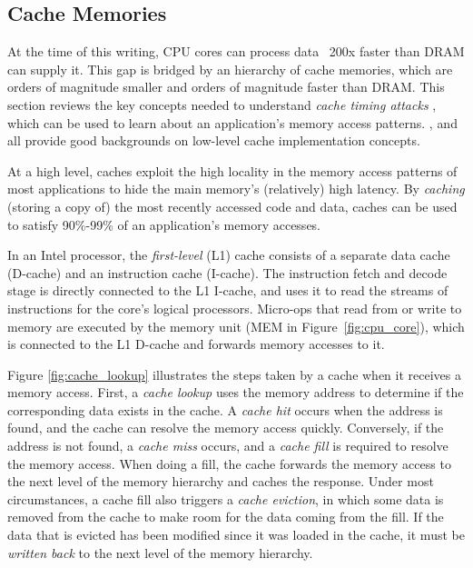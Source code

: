 \subsection{Cache Memories}
\label{sec:caching}

At the time of this writing, CPU cores can process data ~200x faster than DRAM
can supply it. This gap is bridged by an hierarchy of cache memories, which are
orders of magnitude smaller and orders of magnitude faster than DRAM. This
section reviews the key concepts needed to understand \textit{cache timing
attacks} \cite{banescu2011cache}, which can be used to learn about an
application's memory access patterns. \cite{smith1982cache},
\cite{patterson2013architecture} and \cite{hennessy2012architecture} all
provide good backgrounds on low-level cache implementation concepts.

At a high level, caches exploit the high locality in the memory access patterns
of most applications to hide the main memory's (relatively) high latency. By
\textit{caching} (storing a copy of) the most recently accessed code and data,
caches can be used to satisfy 90\%-99\% of an application's memory accesses.

In an Intel processor, the \textit{first-level} (L1) cache consists of a
separate data cache (D-cache) and an instruction cache (I-cache). The
instruction fetch and decode stage is directly connected to the L1 I-cache, and
uses it to read the streams of instructions for the core's logical processors.
Micro-ops that read from or write to memory are executed by the memory unit
(MEM in Figure~\ref{fig:cpu_core}), which is connected to the L1 D-cache and
forwards memory accesses to it.

Figure \ref{fig:cache_lookup} illustrates the steps taken by a cache when it
receives a memory access. First, a \textit{cache lookup} uses the memory
address to determine if the corresponding data exists in the cache. A
\textit{cache hit} occurs when the address is found, and the cache can resolve
the memory access quickly. Conversely, if the address is not found, a
\textit{cache miss} occurs, and a \textit{cache fill} is required to resolve
the memory access. When doing a fill, the cache forwards the memory access to
the next level of the memory hierarchy and caches the response. Under most
circumstances, a cache fill also triggers a \textit{cache eviction}, in which
some data is removed from the cache to make room for the data coming from the
fill. If the data that is evicted has been modified since it was loaded in the
cache, it must be \textit{written back} to the next level of the memory
hierarchy.

